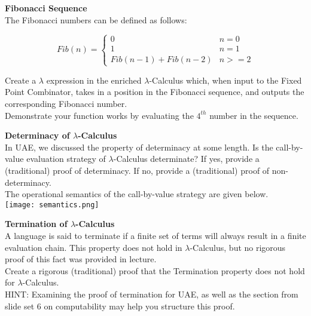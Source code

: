 \documentclass{exam}
\begin{document}
\begin{center}
\end{center}

\begin{questions}
\question[8] \textbf{Fibonacci Sequence} \\
The Fibonacci numbers can be defined as follows:

\begin{equation}
Fib(n) = \begin{cases}
0 & n = 0 \\
1 & n = 1 \\
Fib(n-1) + Fib(n-2) & n >= 2 
\end{cases}
\end{equation}

Create a $\lambda$ expression in the enriched $\lambda$-Calculus which, when input to the Fixed Point Combinator, takes in a position in the Fibonacci sequence, and outputs the corresponding Fibonacci number.  \\

Demonstrate your function works by evaluating the $4^{th}$ number in the sequence.  

\question[6] \textbf{Determinacy of $\lambda$-Calculus} \\
In UAE, we discussed the property of determinacy at some length.  Is the call-by-value evaluation strategy of $\lambda$-Calculus determinate?  If yes, provide a (traditional) proof of determinacy.  If no, provide a (traditional) proof of non-determinacy. \\

The operational semantics of the call-by-value strategy are given below. \\
\texttt{[image: semantics.png]}

\question[6] \textbf{Termination of $\lambda$-Calculus} \\ 
A language is said to terminate if a finite set of terms will always result in a finite evaluation chain.  This property does not hold in $\lambda$-Calculus, but no rigorous proof of this fact was provided in lecture.  \\

Create a rigorous (traditional) proof that the Termination property does not hold for $\lambda$-Calculus.  \\

HINT: Examining the proof of termination for UAE, as well as the section from slide set 6 on computability may help you structure this proof.  

\end{questions}
\end{document}
